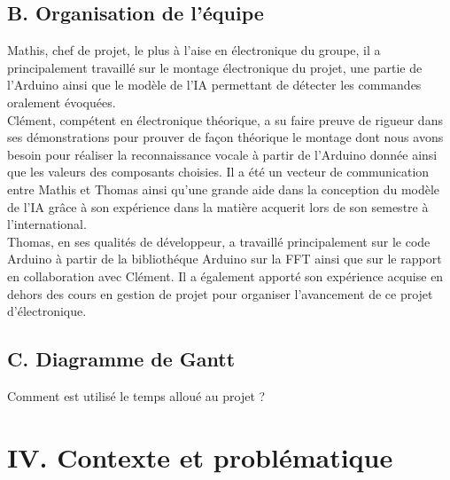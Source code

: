 \documentclass[a4paper,11pt]{book}
\begin{document}
\subsection*{B. Organisation de l'équipe}
Mathis, chef de projet, le plus à l'aise en électronique du groupe, il a principalement travaillé sur le montage électronique du projet, une partie de l'Arduino ainsi que le modèle de l'IA permettant de détecter les commandes oralement évoquées. \\

Clément, compétent en électronique théorique, a su faire preuve de rigueur dans ses démonstrations pour prouver de façon théorique le montage dont nous avons besoin pour réaliser la reconnaissance vocale à partir de l'Arduino donnée ainsi que les valeurs des composants choisies. Il a été un vecteur de communication entre Mathis et Thomas ainsi qu'une grande aide dans la conception du modèle de l'IA grâce à son expérience dans la matière acquerit lors de son semestre à l'international. \\


Thomas, en ses qualités de développeur, a travaillé principalement sur le code Arduino à partir de la bibliothéque Arduino sur la FFT ainsi que sur le rapport en collaboration avec Clément. Il a également apporté son expérience acquise en dehors des cours en gestion de projet pour organiser l'avancement de ce projet d'électronique. \\

\subsection*{C. Diagramme de Gantt}
Comment est utilisé le temps alloué au projet ? 

\newpage
\section*{IV. Contexte et problématique}
\end{document}
